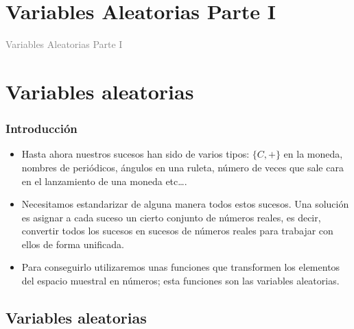 \documentclass[handout]{beamer}\usepackage[]{graphicx}\usepackage[]{color}
\title[\red{Matemáticas III GINF}]{}
\author[]{R. Alberich}
\date{}
\newcommand{\gray}[1]{\textcolor{gray}{#1}}
\renewcommand{\emph}[1]{{\color{red}#1}}
\theoremstyle{plain}
\theoremstyle{definition}
\begin{document}
\beamertemplatedotitem

\lstset{breaklines=true}
\lstset{basicstyle=\ttfamily}


\section{Variables Aleatorias Parte I}

\begin{frame}
\vfill
\begin{center}
\gray{\LARGE Variables Aleatorias Parte I}
\end{center}
\vfill
\end{frame}
\section{Variables aleatorias}

\begin{frame}
\frametitle{Introducción}
\begin{itemize}
\item Hasta ahora nuestros sucesos han sido de varios tipos: $\{C,+\}$ en
la moneda, nombres de periódicos, ángulos en una ruleta, número de
veces que sale cara en el lanzamiento de una moneda etc\ldots.
\item Necesitamos estandarizar de alguna manera todos estos sucesos. Una
solución es asignar a cada suceso un cierto conjunto de
números reales, es decir, convertir todos los sucesos en
\emph{sucesos de números reales} para trabajar con ellos de forma
unificada.
\item Para conseguirlo utilizaremos  unas funciones que
transformen los elementos del espacio muestral en números; esta funciones son las
variables aleatorias.
\end{itemize}
\end{frame}



\subsection{Variables aleatorias}
\end{document}
